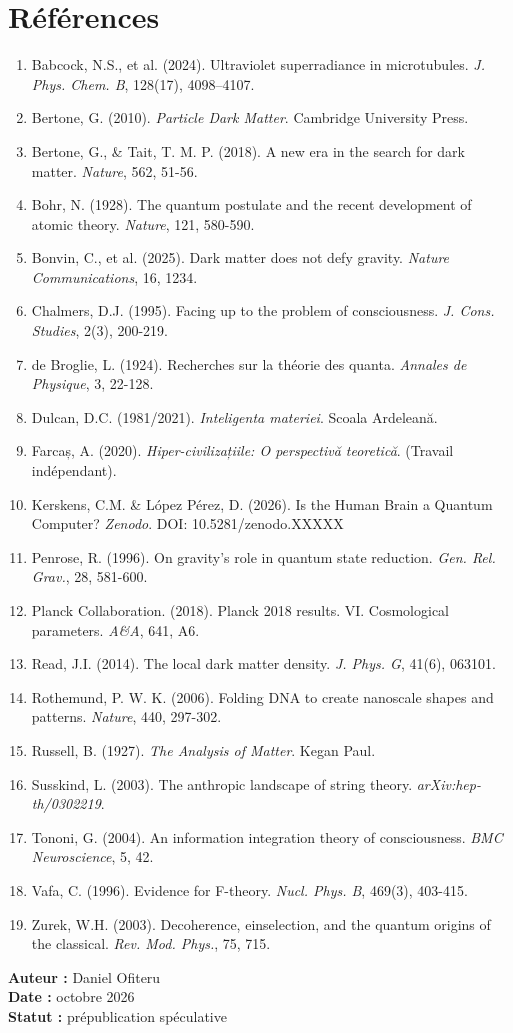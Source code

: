 \documentclass[11pt,a4paper]{article}
\begin{document}
\section*{Références}
\begin{enumerate}
    \item Babcock, N.S., et al. (2024). Ultraviolet superradiance in microtubules. \textit{J. Phys. Chem. B}, 128(17), 4098--4107.
    \item Bertone, G. (2010). \textit{Particle Dark Matter}. Cambridge University Press.
    \item Bertone, G., \& Tait, T. M. P. (2018). A new era in the search for dark matter. \textit{Nature}, 562, 51-56.
    \item Bohr, N. (1928). The quantum postulate and the recent development of atomic theory. \textit{Nature}, 121, 580-590.
    \item Bonvin, C., et al. (2025). Dark matter does not defy gravity. \textit{Nature Communications}, 16, 1234.
    \item Chalmers, D.J. (1995). Facing up to the problem of consciousness. \textit{J. Cons. Studies}, 2(3), 200-219.
    \item de Broglie, L. (1924). Recherches sur la théorie des quanta. \textit{Annales de Physique}, 3, 22-128.
    \item Dulcan, D.C. (1981/2021). \textit{Inteligenta materiei}. Scoala Ardeleană.
    \item Farcaș, A. (2020). \textit{Hiper-civilizațiile: O perspectivă teoretică}. (Travail indépendant).
    \item Kerskens, C.M. \& López Pérez, D. (2026). Is the Human Brain a Quantum Computer? \textit{Zenodo}. DOI: 10.5281/zenodo.XXXXX
    \item Penrose, R. (1996). On gravity's role in quantum state reduction. \textit{Gen. Rel. Grav.}, 28, 581-600.
    \item Planck Collaboration. (2018). Planck 2018 results. VI. Cosmological parameters. \textit{A\&A}, 641, A6.
    \item Read, J.I. (2014). The local dark matter density. \textit{J. Phys. G}, 41(6), 063101.
    \item Rothemund, P. W. K. (2006). Folding DNA to create nanoscale shapes and patterns. \textit{Nature}, 440, 297-302.
    \item Russell, B. (1927). \textit{The Analysis of Matter}. Kegan Paul.
    \item Susskind, L. (2003). The anthropic landscape of string theory. \textit{arXiv:hep-th/0302219}.
    \item Tononi, G. (2004). An information integration theory of consciousness. \textit{BMC Neuroscience}, 5, 42.
    \item Vafa, C. (1996). Evidence for F-theory. \textit{Nucl. Phys. B}, 469(3), 403-415.
    \item Zurek, W.H. (2003). Decoherence, einselection, and the quantum origins of the classical. \textit{Rev. Mod. Phys.}, 75, 715.
\end{enumerate}

\vspace{1cm}
\begin{flushright}
\textbf{Auteur :} Daniel Ofiteru \\
\textbf{Date :} octobre 2026 \\
\textbf{Statut :} prépublication spéculative
\end{flushright}
\end{document}
